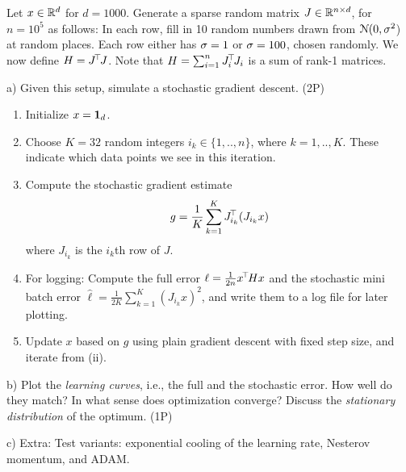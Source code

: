 Let $x\in{\mathbb{R}}^d$ for $d=1000$. Generate a sparse
random matrix
$J\in{\mathbb{R}}^{n\times d}$, for $n=10^5$ as follows: In each
row, fill in 10 random numbers drawn from ${\cal N}(0,\sigma^2$) at random
places. Each row either has $\sigma=1$ or $\sigma=100$, chosen randomly. We
now define $H = J^{\!\top\!} J$. Note that $H=\sum_{i=1}^n J_i^{\!\top\!} J_i$ is a
sum of rank-1 matrices.

a) Given this setup, simulate a stochastic gradient descent. (2P)
\begin{enumerate}
\item Initialize $x={{\bf 1}}_d$.
\item Choose $K=32$ random integers $i_k \in \{1,..,n\}$, where $k=1,..,K$. These indicate which data points we see in this iteration.
\item Compute the stochastic gradient estimate
$$g = \frac{1}{K} \sum_{k=1}^K J_{i_k}^{\!\top\!} (J_{i_k} x)  $$
where $J_{i_k}$ is the $i_k$th row of $J$.
\item For logging: Compute the full error $\ell=\frac{1}{2n} x^{\!\top\!} H x$ and the stochastic mini batch error $\hat\ell=\frac{1}{2K} \sum_{k=1}^K (J_{i_k} x)^2$, and write them to a log file for later plotting.
\item Update $x$ based on $g$ using plain gradient descent with fixed step size, and iterate from (ii).
\end{enumerate}

b) Plot the \emph{learning curves}, i.e., the full and the stochastic error. How well do they match? In what sense does optimization converge? Discuss the \emph{stationary distribution} of the optimum. (1P)

c) Extra: Test variants: exponential cooling of the learning rate, Nesterov momentum, and ADAM.



\exerfoot
